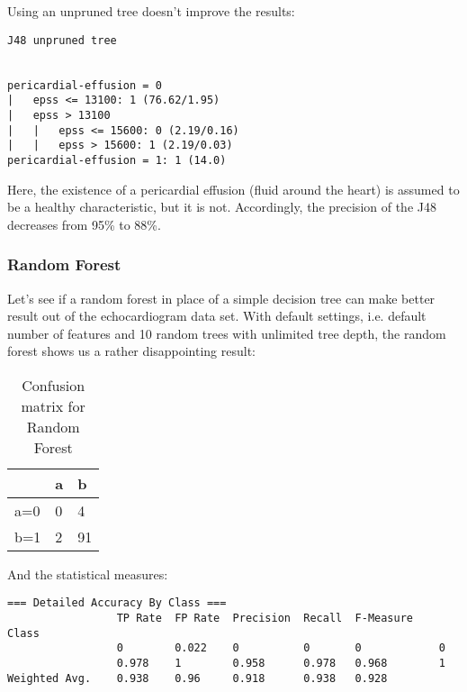 \documentclass[paper=a4, fontsize=11pt]{scrartcl} %
\numberwithin{equation}{section} %
\numberwithin{figure}{section} %
\numberwithin{table}{section} %
\begin{document}
Using an unpruned tree doesn't improve the results:
\begin{lstlisting}
J48 unpruned tree


pericardial-effusion = 0
|   epss <= 13100: 1 (76.62/1.95)
|   epss > 13100
|   |   epss <= 15600: 0 (2.19/0.16)
|   |   epss > 15600: 1 (2.19/0.03)
pericardial-effusion = 1: 1 (14.0)
\end{lstlisting}
Here, the existence of a pericardial effusion (fluid around the heart) is assumed to be a healthy characteristic, but it is not. Accordingly, the precision of the J48 decreases from 95\% to 88\%.

\subsubsection{Random Forest}
Let's see if a random forest in place of a simple decision tree can make better result out of the echocardiogram data set. With default settings, i.e. default number of features  and 10 random trees with unlimited tree depth, the random forest shows us a rather disappointing result:
	
\begin{table}[h]
\centering
\begin{tabular}{|l|ll|}
\hline
 & a &	b \\
\hline
a=0 & 0 & 4 \\
b=1 & 2 & 91\\
\hline
\end{tabular}
\caption{Confusion matrix for Random Forest}
\end{table}

And the statistical measures:
\begin{lstlisting}
=== Detailed Accuracy By Class ===
                 TP Rate  FP Rate  Precision  Recall  F-Measure    Class
                 0        0.022    0          0       0            0
                 0.978    1        0.958      0.978   0.968        1
Weighted Avg.    0.938    0.96     0.918      0.938   0.928     
\end{lstlisting}
\end{document}
